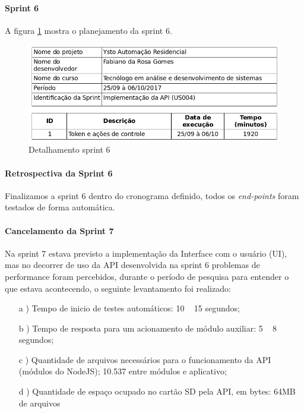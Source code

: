 \paragraph{Sprint 6} A figura \ref{sprint-6} mostra o planejamento da sprint 6.

\begin{figure}[H]
\caption{\label{sprint-6} Detalhamento sprint 6}
\includegraphics[scale=0.5]{img/sprint-6.png}
\end{figure}

\paragraph{Retrospectiva da Sprint 6}
Finalizamos a sprint 6 dentro do cronograma definido, todos os \textit{end-points} foram testados de forma automática.

\paragraph{Cancelamento da Sprint 7}
Na sprint 7 estava previsto a implementação da Interface com o usuário (UI), mas no decorrer de uso da API desenvolvida na sprint 6 problemas de performance foram percebidos, durante o período de pesquisa para entender o que estava acontecendo, o seguinte levantamento foi realizado:

\begin{itemize}
    \item[a]) Tempo de inicio de testes automáticos: 10 ~ 15 segundos;
    \item[b]) Tempo de resposta para um acionamento de módulo auxiliar: 5 ~ 8 segundos;
    \item[c]) Quantidade de arquivos necessários para o funcionamento da API (módulos do NodeJS); 10.537 entre módulos e aplicativo;
    \item[d]) Quantidade de espaço ocupado no cartão SD pela API, em bytes: 64MB de arquivos
\end{itemize}

